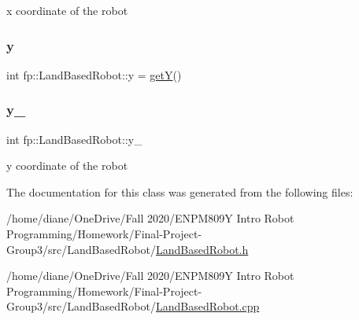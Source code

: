 x coordinate of the robot \mbox{\label{classfp_1_1_land_based_robot_ad1ff889538680eba6bc6eb135b4ccd63}} 
\subsubsection{\texorpdfstring{y}{y}}
{\footnotesize\ttfamily int fp\+::\+Land\+Based\+Robot\+::y = \hyperlink{classfp_1_1_land_based_robot_ac2f55928ef37240afda0773e15ad5b17}{getY}()}

\mbox{\label{classfp_1_1_land_based_robot_a130cfd6ad383116076dc891ee3a52671}} 
\subsubsection{\texorpdfstring{y\+\_\+}{y\_}}
{\footnotesize\ttfamily int fp\+::\+Land\+Based\+Robot\+::y\+\_\+\hspace{0.3cm}{\ttfamily [protected]}}

y coordinate of the robot 

The documentation for this class was generated from the following files\+:\begin{DoxyCompactItemize}
\item 
/home/diane/\+One\+Drive/\+Fall 2020/\+E\+N\+P\+M809\+Y Intro Robot Programming/\+Homework/\+Final-\/\+Project-\/\+Group3/src/\+Land\+Based\+Robot/\hyperlink{_land_based_robot_8h}{Land\+Based\+Robot.\+h}\item 
/home/diane/\+One\+Drive/\+Fall 2020/\+E\+N\+P\+M809\+Y Intro Robot Programming/\+Homework/\+Final-\/\+Project-\/\+Group3/src/\+Land\+Based\+Robot/\hyperlink{_land_based_robot_8cpp}{Land\+Based\+Robot.\+cpp}\end{DoxyCompactItemize}
